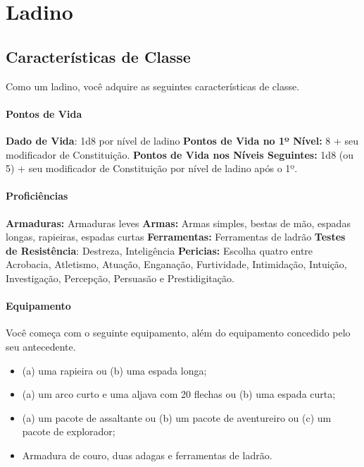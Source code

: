 \documentclass{RPG_Adventure}[2021/10/20]
\begin{document}
\chapter{Ladino}%
\label{cha:ladino}
\begin{multicols}{2}

\section*{Características de Classe}%

Como um ladino, você adquire as seguintes características de classe.

\subsubsection{Pontos de Vida}%

\noindent\textbf{Dado de Vida}: 1d8 por nível de ladino \nl
\textbf{Pontos de Vida no 1º Nível:} 8 + seu modificador de Constituição. \nl
\textbf{Pontos de Vida nos Níveis Seguintes:} 1d8 (ou 5) + seu modificador de
Constituição por nível de ladino após o 1º.

\subsubsection{Proficiências}%

\noindent\textbf{Armaduras:} Armaduras leves \nl
\textbf{Armas:} Armas simples, bestas de mão, espadas longas, rapieiras, espadas
curtas\nl
\textbf{Ferramentas:} Ferramentas de ladrão \jump
\textbf{Testes de Resistência}: Destreza, Inteligência \nl
\textbf{Pericias:} Escolha quatro entre Acrobacia, Atletismo, Atuação,
Enganação, Furtividade, Intimidação, Intuição, Investigação, Percepção,
Persuasão e Prestidigitação.

\subsubsection{Equipamento}%

\noindent Você começa com o seguinte equipamento, além do equipamento concedido pelo seu
antecedente.
\begin{itemize}
    \item (a) uma rapieira ou (b) uma espada longa;
    \item (a) um arco curto e uma aljava com 20 flechas ou (b) uma espada curta;
    \item (a) um pacote de assaltante ou (b) um pacote de aventureiro ou (c) um
        pacote de explorador;
    \item Armadura de couro, duas adagas e ferramentas de ladrão.
\end{itemize}


\end{multicols}
\end{document}
